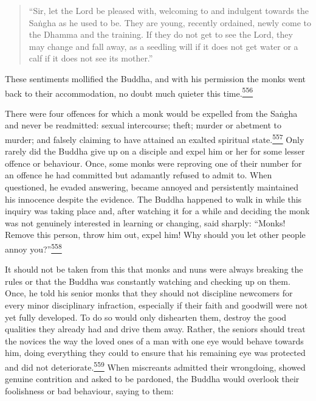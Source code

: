 \begin{quote}
``Sir, let the Lord be pleased with, welcoming to and indulgent towards
the Saṅgha as he used to be. They are young, recently ordained, newly
come to the Dhamma and the training. If they do not get to see the Lord,
they may change and fall away, as a seedling will if it does not get
water or a calf if it does not see its mother.''
\end{quote}

These sentiments mollified the Buddha, and with his permission the monks
went back to their accommodation, no doubt much quieter this
time.\label{footprints_split_014.html_fnref556}\hyperref[footprints_split_025.htmlux5cux23fn556]{\textsuperscript{556}}

There were four offences for which a monk would be expelled from the
Saṅgha and never be readmitted: sexual intercourse; theft; murder or
abetment to murder; and falsely claiming to have attained an exalted
spiritual
state.\label{footprints_split_014.html_fnref557}\hyperref[footprints_split_025.htmlux5cux23fn557]{\textsuperscript{557}}
Only rarely did the Buddha give up on a disciple and expel him or her
for some lesser offence or behaviour. Once, some monks were reproving
one of their number for an offence he had committed but adamantly
refused to admit to. When questioned, he evaded answering, became
annoyed and persistently maintained his innocence despite the evidence.
The Buddha happened to walk in while this inquiry was taking place and,
after watching it for a while and deciding the monk was not genuinely
interested in learning or changing, said sharply: ``Monks! Remove this
person, throw him out, expel him! Why should you let other people annoy
you?''\label{footprints_split_014.html_fnref558}\hyperref[footprints_split_025.htmlux5cux23fn558]{\textsuperscript{558}}

It should not be taken from this that monks and nuns were always
breaking the rules or that the Buddha was constantly watching and
checking up on them. Once, he told his senior monks that they should not
discipline newcomers for every minor disciplinary infraction, especially
if their faith and goodwill were not yet fully developed. To do so would
only dishearten them, destroy the good qualities they already had and
drive them away. Rather, the seniors should treat the novices the way
the loved ones of a man with one eye would behave towards him, doing
everything they could to ensure that his remaining eye was protected and
did not
deteriorate.\label{footprints_split_014.html_fnref559}\hyperref[footprints_split_025.htmlux5cux23fn559]{\textsuperscript{559}}
When miscreants admitted their wrongdoing, showed genuine contrition and
asked to be pardoned, the Buddha would overlook their foolishness or bad
behaviour, saying to them:

